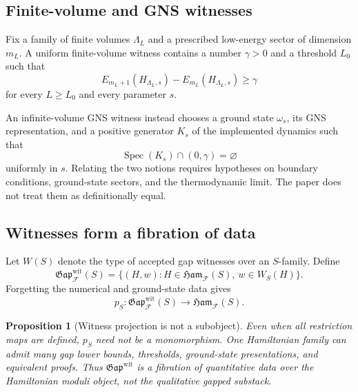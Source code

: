 \documentclass[12pt]{article}
\newtheorem{proposition}[theorem]{Proposition}
\theoremstyle{definition}
\theoremstyle{remark}
\newcommand{\F}{\mathcal F}
\newcommand{\Ham}{\mathfrak{Ham}}
\newcommand{\Gap}{\mathfrak{Gap}}
\newcommand{\Spec}{\operatorname{Spec}}
\begin{document}
\subsection{Finite-volume and GNS witnesses}

Fix a family of finite volumes $\Lambda_L$ and a prescribed low-energy
sector of dimension $m_L$.  A uniform finite-volume witness contains a
number $\gamma>0$ and a threshold $L_0$ such that
\begin{equation}
E_{m_L+1}(H_{\Lambda_L,s})-E_{m_L}(H_{\Lambda_L,s})
\ge\gamma
\label{eq:finite-volume-family-gap}
\end{equation}
for every $L\ge L_0$ and every parameter $s$.

An infinite-volume GNS witness instead chooses a ground state $\omega_s$,
its GNS representation, and a positive generator $K_s$ of the implemented
dynamics such that
\begin{equation}
\Spec(K_s)\cap(0,\gamma)=\varnothing
\label{eq:gns-gap}
\end{equation}
uniformly in $s$.  Relating the two notions requires hypotheses on boundary
conditions, ground-state sectors, and the thermodynamic limit.  The paper
does not treat them as definitionally equal.

\subsection{Witnesses form a fibration of data}

Let $W(S)$ denote the type of accepted gap witnesses over an $S$-family.
Define
\begin{equation}
\Gap^{\mathrm{wit}}_{\F}(S)
=
\{(H,w): H\in\Ham_{\F}(S),\ w\in W_S(H)\}.
\label{eq:witness-gap-object}
\end{equation}
Forgetting the numerical and ground-state data gives
\begin{equation}
p_S:\Gap^{\mathrm{wit}}_{\F}(S)\longrightarrow\Ham_{\F}(S).
\label{eq:witness-projection}
\end{equation}

\begin{proposition}[Witness projection is not a subobject]
\label{prop:witness-not-subobject}
Even when all restriction maps are defined, $p_S$ need not be a
monomorphism.  One Hamiltonian family can admit many gap lower bounds,
thresholds, ground-state presentations, and equivalent proofs.  Thus
$\Gap^{\mathrm{wit}}$ is a fibration of quantitative data over the
Hamiltonian moduli object, not the qualitative gapped substack.
\end{proposition}
\end{document}
